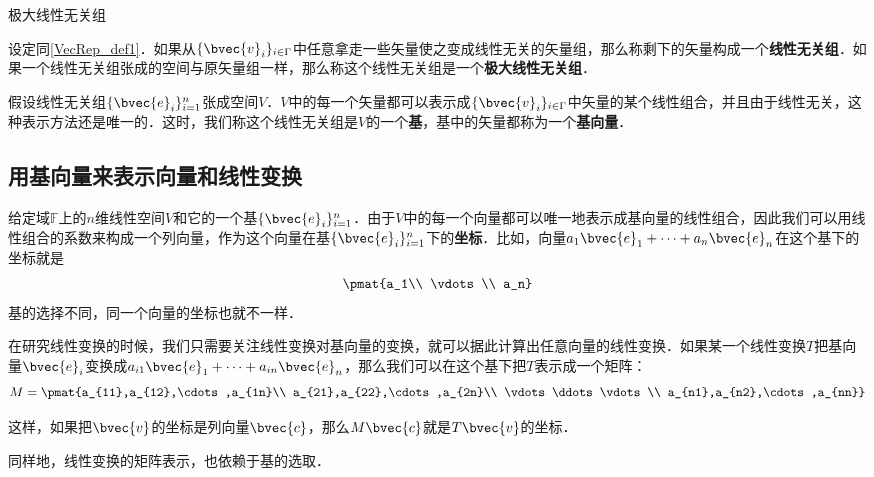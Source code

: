 \begin{definition}{极大线性无关组}

设定同\autoref{VecRep_def1}．如果从$\{\bvec{v}_i\}_{i\in\Gamma}$中任意拿走一些矢量使之变成线性无关的矢量组，那么称剩下的矢量构成一个\textbf{线性无关组}．如果一个线性无关组张成的空间与原矢量组一样，那么称这个线性无关组是一个\textbf{极大线性无关组}．

\end{definition}

假设线性无关组$\{\bvec{e}_i\}_{i=1}^{n}$张成空间$V$．$V$中的每一个矢量都可以表示成$\{\bvec{v}_i\}_{i\in\Gamma}$中矢量的某个线性组合，并且由于线性无关，这种表示方法还是唯一的．这时，我们称这个线性无关组是$V$的一个\textbf{基}，基中的矢量都称为一个\textbf{基向量}．

\subsection{用基向量来表示向量和线性变换}

给定域$\mathbb{F}$上的$n$维线性空间$V$和它的一个基$\{\bvec{e}_i\}_{i=1}^{n}$．由于$V$中的每一个向量都可以唯一地表示成基向量的线性组合，因此我们可以用线性组合的系数来构成一个列向量，作为这个向量在基$\{\bvec{e}_i\}_{i=1}^{n}$下的\textbf{坐标}．比如，向量$a_1\bvec{e}_1+\cdots+a_n\bvec{e}_n$在这个基下的坐标就是
\begin{equation}
\pmat{a_1\\ \vdots\\ a_n}
\end{equation}
基的选择不同，同一个向量的坐标也就不一样．

在研究线性变换的时候，我们只需要关注线性变换对基向量的变换，就可以据此计算出任意向量的线性变换．如果某一个线性变换$T$把基向量$\bvec{e}_i$变换成$a_{i1}\bvec{e}_1+\cdots+a_{in}\bvec{e}_n$，那么我们可以在这个基下把$T$表示成一个矩阵：
\begin{equation}
M=\pmat{a_{11},a_{12},\cdots,a_{1n}\\ a_{21},a_{22},\cdots,a_{2n}\\ \vdots\ddots\vdots\\ a_{n1},a_{n2},\cdots,a_{nn}}
\end{equation}

这样，如果把$\bvec{v}$的坐标是列向量$\bvec{c}$，那么$M\bvec{c}$就是$T\bvec{v}$的坐标．

同样地，线性变换的矩阵表示，也依赖于基的选取．